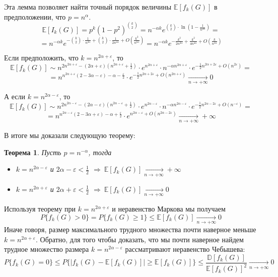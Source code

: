 \documentclass[a4paper]{article}
\newtheorem{mtheorem}{Теорема}[section]
\begin{document}
Эта лемма позволяет найти точный порядок величины $\mathbb{E}[f_k(G)]$ в предположении, что $p = n^\alpha$.
$$\mathbb{E}[I_k(G)] = p^k(1-p^2)^{\binom{k}{2}} = n^{-\alpha k}e^{\binom{k}{2}\cdot\ln\left(1-\frac{1}{n^{2\alpha}}\right)} = $$
$$ = n^{-\alpha k}e^{-\binom{k}{2}\cdot\frac{1}{n^{2\alpha}} + \binom{k}{2}\cdot\frac{1}{2n^{4\alpha}}+ 
O\left(\frac{k^2}{n^{6\alpha}}\right)} = n^{-\alpha k}e^{-\frac{k^2}{2n^{2\alpha}} + \frac{k^2}{4n^{4\alpha}} + 
O\left(\frac{k}{n^{2\alpha}}\right)}$$

Если предположить, что $k = n^{2\alpha + \varepsilon}$, то $$\mathbb{E}[f_k(G)] \sim n^{2n^{2\alpha + \varepsilon} -
(2\alpha + \varepsilon)(n^{2\alpha + \varepsilon} + \frac{1}{2})}\cdot e^{n^{2\alpha + \varepsilon}}\cdot 
n^{-\alpha n^{2\alpha+\varepsilon}}\cdot e^{-\frac{1}{2}n^{2\alpha + 2\varepsilon} + O\left(n^{2\varepsilon}\right)} = $$
$$ = n^{n^{2\alpha + \varepsilon}(2 - 3\alpha - \varepsilon) - \alpha - \frac{\varepsilon}{2}}\cdot 
e^{-\frac{1}{2}n^{2\alpha + 2\varepsilon} + O\left(n^{2\alpha + \varepsilon}\right)}\xrightarrow[n \to +\infty]{} 0$$

А если $k = n^{2\alpha - \varepsilon}$, то $$\mathbb{E}[f_k(G)] \sim n^{2n^{2\alpha - \varepsilon} - 
(2\alpha - \varepsilon)(n^{2\alpha - \varepsilon} + \frac{1}{2})}\cdot e^{n^{2\alpha - \varepsilon}}\cdot 
n^{-\alpha n^{2\alpha-\varepsilon}}\cdot e^{-\frac{1}{2}n^{2\alpha - 2\varepsilon} + O\left(n^{-\varepsilon}\right)} = $$
$$ = n^{n^{2\alpha - \varepsilon}(2 - 3\alpha +\varepsilon) - \alpha + \frac{\varepsilon}{2}}\cdot 
e^{n^{2\alpha - \varepsilon}+O(n^{2\alpha - 2\varepsilon})}\xrightarrow[n \to +\infty]{} +\infty$$

В итоге мы доказали следующую теорему:
\begin{mtheorem}
	Пусть $p = n^{-\alpha}$, тогда 
	\begin{itemize}[noitemsep]
		\item $k = n^{2\alpha - \varepsilon}$ и $2\alpha - \varepsilon < \frac{1}{2}$ $\Longrightarrow\ \mathbb{E}[f_k(G)]\xrightarrow[n \to +\infty]{} +\infty$
		\item $k = n^{2\alpha + \varepsilon}$ и $2\alpha + \varepsilon < \frac{1}{2}$  $\Longrightarrow\ \mathbb{E}[f_k(G)]\xrightarrow[n \to +\infty]{} 0$
	\end{itemize}
\end{mtheorem}
Используя теорему при $k = n^{2\alpha + \varepsilon}$ и неравенство Маркова мы получаем
$$P\{f_k(G) > 0\} = P\{f_k(G) \geq 1\} \leq \mathbb{E}[f_k(G)]\xrightarrow[n \to +\infty]{} 0$$
Иначе говоря, размер максимального трудного множества почти наверное меньше $ k = n^{2\alpha + \varepsilon}$.
Обратно, для того чтобы доказать, что мы почти наверное найдем трудное множество размера 
$k = n^{2\alpha - \varepsilon}$ рассматривают неравенство Чебышева: $$P\{f_k(G) = 0\} \leq P\{|f_k(G) - 
\mathbb{E}[f_k(G)]|\geq \mathbb{E}[f_k(G)]\} \leq \frac{\mathbb{D}[f_k(G)]}{\mathbb{E}[f_k(G)]^2}\xrightarrow[n \to +\infty]{} 0$$
\end{document}
